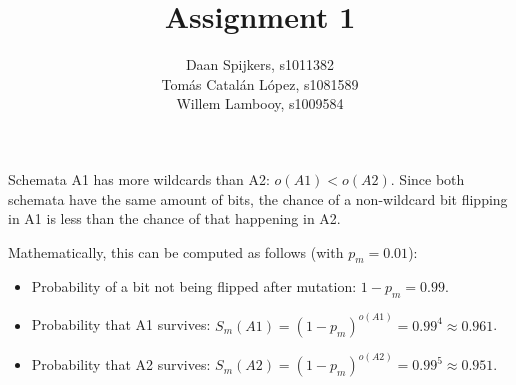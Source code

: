 \documentclass{scrartcl}
\title{Assignment 1}
\author{Daan Spijkers, s1011382\\ Tomás Catalán López, s1081589\\ Willem Lambooy, s1009584}
\begin{document}
\maketitle

\section{}
Schemata A1 has more wildcards than A2: $o(A1) < o(A2)$. Since both schemata have the same amount of bits, the chance of a non-wildcard bit flipping in A1 is less than the chance of that happening in A2.

Mathematically, this can be computed as follows (with $p_m=0.01$):
\begin{itemize}
  \item Probability of a bit not being flipped after mutation: $1-p_m=0.99$.
  \item Probability that A1 survives: $S_m(A1)=(1-p_m)^{o(A1)}=0.99^4\approx0.961$.
  \item Probability that A2 survives: $S_m(A2)=(1-p_m)^{o(A2)}=0.99^5\approx0.951$.
\end{itemize}
\end{document}
